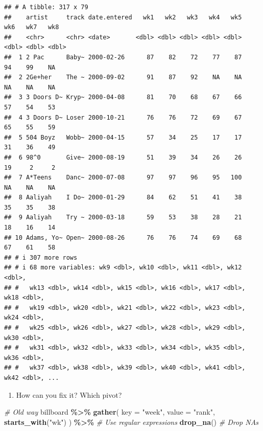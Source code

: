 \documentclass[
]{book}
\newenvironment{Shaded}{\begin{snugshade}}{\end{snugshade}}
\newcommand{\AttributeTok}[1]{\textcolor[rgb]{0.13,0.29,0.53}{#1}}
\newcommand{\CommentTok}[1]{\textcolor[rgb]{0.56,0.35,0.01}{\textit{#1}}}
\newcommand{\FunctionTok}[1]{\textcolor[rgb]{0.13,0.29,0.53}{\textbf{#1}}}
\newcommand{\NormalTok}[1]{#1}
\newcommand{\SpecialCharTok}[1]{\textcolor[rgb]{0.81,0.36,0.00}{\textbf{#1}}}
\newcommand{\StringTok}[1]{\textcolor[rgb]{0.31,0.60,0.02}{#1}}
\providecommand{\tightlist}{%
  \setlength{\itemsep}{0pt}\setlength{\parskip}{0pt}}
\begin{document}
\begin{verbatim}
## # A tibble: 317 x 79
##    artist     track date.entered   wk1   wk2   wk3   wk4   wk5   wk6   wk7   wk8
##    <chr>      <chr> <date>       <dbl> <dbl> <dbl> <dbl> <dbl> <dbl> <dbl> <dbl>
##  1 2 Pac      Baby~ 2000-02-26      87    82    72    77    87    94    99    NA
##  2 2Ge+her    The ~ 2000-09-02      91    87    92    NA    NA    NA    NA    NA
##  3 3 Doors D~ Kryp~ 2000-04-08      81    70    68    67    66    57    54    53
##  4 3 Doors D~ Loser 2000-10-21      76    76    72    69    67    65    55    59
##  5 504 Boyz   Wobb~ 2000-04-15      57    34    25    17    17    31    36    49
##  6 98^0       Give~ 2000-08-19      51    39    34    26    26    19     2     2
##  7 A*Teens    Danc~ 2000-07-08      97    97    96    95   100    NA    NA    NA
##  8 Aaliyah    I Do~ 2000-01-29      84    62    51    41    38    35    35    38
##  9 Aaliyah    Try ~ 2000-03-18      59    53    38    28    21    18    16    14
## 10 Adams, Yo~ Open~ 2000-08-26      76    76    74    69    68    67    61    58
## # i 307 more rows
## # i 68 more variables: wk9 <dbl>, wk10 <dbl>, wk11 <dbl>, wk12 <dbl>,
## #   wk13 <dbl>, wk14 <dbl>, wk15 <dbl>, wk16 <dbl>, wk17 <dbl>, wk18 <dbl>,
## #   wk19 <dbl>, wk20 <dbl>, wk21 <dbl>, wk22 <dbl>, wk23 <dbl>, wk24 <dbl>,
## #   wk25 <dbl>, wk26 <dbl>, wk27 <dbl>, wk28 <dbl>, wk29 <dbl>, wk30 <dbl>,
## #   wk31 <dbl>, wk32 <dbl>, wk33 <dbl>, wk34 <dbl>, wk35 <dbl>, wk36 <dbl>,
## #   wk37 <dbl>, wk38 <dbl>, wk39 <dbl>, wk40 <dbl>, wk41 <dbl>, wk42 <dbl>, ...
\end{verbatim}

\begin{enumerate}
\def\labelenumi{\arabic{enumi}.}
\setcounter{enumi}{1}
\tightlist
\item
  How can you fix it? Which pivot?
\end{enumerate}

\begin{Shaded}
\begin{Highlighting}[]
\CommentTok{\# Old way}
\NormalTok{billboard }\SpecialCharTok{\%\textgreater{}\%}
  \FunctionTok{gather}\NormalTok{(}
    \AttributeTok{key =} \StringTok{"week"}\NormalTok{,}
    \AttributeTok{value =} \StringTok{"rank"}\NormalTok{,}
    \FunctionTok{starts\_with}\NormalTok{(}\StringTok{"wk"}\NormalTok{)}
\NormalTok{  ) }\SpecialCharTok{\%\textgreater{}\%} \CommentTok{\# Use regular expressions}
  \FunctionTok{drop\_na}\NormalTok{() }\CommentTok{\# Drop NAs}
\end{Highlighting}
\end{Shaded}
\end{document}
